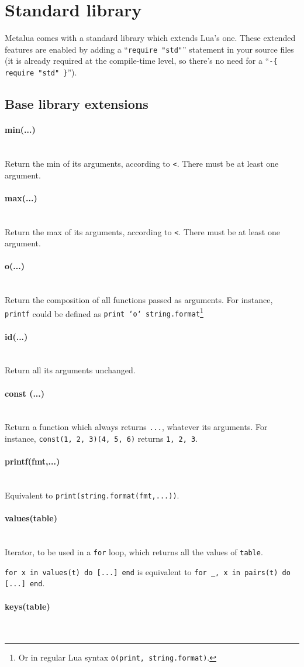 \def\function#1{\paragraph{#1}~\\}

\section{Standard library}
Metalua comes with a standard library which extends Lua's one. These
extended features are enabled by adding a ``{\tt require "std"}''
statement in your source files (it is already required at the
compile-time level, so there's no need for a 
``{\tt -\{ require "std" \}}''). 

\subsection{Base library extensions}

\function{min(...)}

Return the min of its arguments, according to {\tt<}. There must be at
least one argument.

\function{max(...)}

Return the max of its arguments, according to {\tt<}. There must be at
least one argument.

\function{o(...)}  

Return the composition of all functions passed as arguments. For
instance, {\tt printf} could be defined as {\tt print `o`
  string.format}\footnote{Or in regular Lua syntax {\tt o(print,
    string.format)}.}

\function{id(...)}

Return all its arguments unchanged.


\function{const (...)}

Return a function which always returns {\tt ...}, whatever its arguments.
For instance, {\tt const(1, 2, 3)(4, 5, 6)} returns {\tt1, 2, 3}.

\function{printf(fmt,...)}

Equivalent to {\tt print(string.format(fmt,...))}.

\function{values(table)}

Iterator, to be used in a {\tt for} loop, which returns all the values
of {\tt table}. 

{\tt for x in values(t) do [...] end} is equivalent to {\tt for \_, x in
  pairs(t) do [...] end}.

\function{keys(table)}


